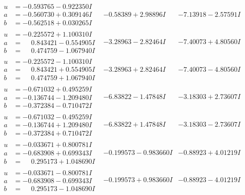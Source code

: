 \documentclass[1p]{elsarticle_modified}
\theoremstyle{definition}
\begin{document}
$$\begin{array}{c|c|c}
\begin{aligned}
u &= -0.593765 - 0.922350 I \\
a &= -0.560730 + 0.309146 I \\
b &= -0.562518 + 0.030265 I\end{aligned}
 & -0.58389 + 2.98896 I & -7.13918 - 2.57591 I \\ \hline\begin{aligned}
u &= -0.225572 + 1.100310 I \\
a &= \phantom{-}0.843421 - 0.554905 I \\
b &= \phantom{-}0.474759 - 1.067940 I\end{aligned}
 & -3.28963 - 2.82464 I & -7.40073 + 4.80560 I \\ \hline\begin{aligned}
u &= -0.225572 - 1.100310 I \\
a &= \phantom{-}0.843421 + 0.554905 I \\
b &= \phantom{-}0.474759 + 1.067940 I\end{aligned}
 & -3.28963 + 2.82464 I & -7.40073 - 4.80560 I \\ \hline\begin{aligned}
u &= -0.671032 + 0.495259 I \\
a &= -0.136744 - 1.209480 I \\
b &= -0.372384 - 0.710472 I\end{aligned}
 & -6.83822 - 1.47848 I & -3.18303 + 2.73607 I \\ \hline\begin{aligned}
u &= -0.671032 - 0.495259 I \\
a &= -0.136744 + 1.209480 I \\
b &= -0.372384 + 0.710472 I\end{aligned}
 & -6.83822 + 1.47848 I & -3.18303 - 2.73607 I \\ \hline\begin{aligned}
u &= -0.033671 + 0.800781 I \\
a &= -0.683908 + 0.699343 I \\
b &= \phantom{-}0.295173 + 1.048690 I\end{aligned}
 & -0.199573 - 0.983660 I & -0.88923 + 4.01219 I \\ \hline\begin{aligned}
u &= -0.033671 - 0.800781 I \\
a &= -0.683908 - 0.699343 I \\
b &= \phantom{-}0.295173 - 1.048690 I\end{aligned}
 & -0.199573 + 0.983660 I & -0.88923 - 4.01219 I \\ \hline\begin{aligned}

\end{aligned}
\end{array}$$
\end{document}

